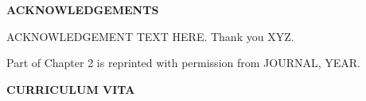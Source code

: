 \documentclass[12pt, oneside]{report}
\begin{document}
\newpage
\pagestyle{plain} %

\begin{center}
    {\bfseries \Large ACKNOWLEDGEMENTS}
\end{center}

\vspace{0.4in}

\begin{singlespacing}
\setlength{\parindent}{0.5in} %

ACKNOWLEDGEMENT TEXT HERE. Thank you XYZ.


Part of Chapter 2 is reprinted with permission from JOURNAL, YEAR. 

\end{singlespacing}
\clearpage

\clearpage
\begin{singlespacing} %
    \renewcommand{\contentsname}{Table of Contents}
    \tableofcontents
\end{singlespacing}
\clearpage

\listoffigures
\clearpage

\listoftables
\clearpage

\newpage
\pagestyle{plain} %

\begin{center}
    {\bfseries \Large CURRICULUM VITA}
\end{center}

\vspace{0.4in}
\end{document}
